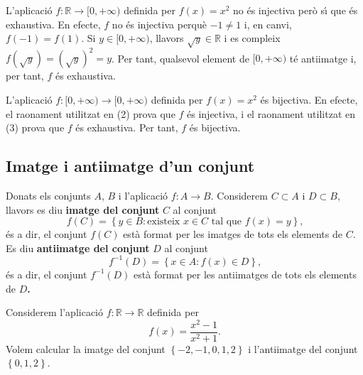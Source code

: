 \begin{exemple}
L'aplicaci\'{o} $f:\mathbb{R}\longrightarrow\lbrack0,+\infty)$ definida per $%
f(x)=x^{2}$ no \'{e}s injectiva per\`{o} s\'{\i} que \'{e}s exhaustiva. En
efecte, $f$ no \'{e}s injectiva perqu\`{e} $-1\neq1$ i, en canvi, $f(-1)=f(1)
$. Si $y\in\lbrack0,+\infty)$, llavors $\sqrt{y}\in\mathbb{R}$ i es compleix
$f\left( \sqrt{y}\right) =\left( \sqrt{y}\right) ^{2}=y$. Per tant,
qualsevol element de $[0,+\infty)$ t\'{e} antiimatge i, per tant, $f$ \'{e}s
exhaustiva.
\end{exemple}

\begin{exemple}
L'aplicaci\'{o} $f:[0,+\infty)\longrightarrow\lbrack0,+\infty)$ definida per
$f(x)=x^{2}$ \'{e}s bijectiva. En efecte, el raonament utilitzat en (2)
prova que $f$ \'{e}s injectiva, i el raonament utilitzat en (3) prova que $f$
\'{e}s exhaustiva. Per tant, $f$ \'{e}s bijectiva.
\end{exemple}

\subsection{Imatge i antiimatge d'un conjunt}

Donats els conjunts $A$, $B$ i l'aplicaci\'{o} $f:A\longrightarrow B$.
Considerem $C\subset A$ i $D\subset B$, llavors es diu \textbf{imatge del
conjunt} $C$ al conjunt%
\begin{equation*}
f(C)=\left\{ y\in B:\text{existeix }x\in C\text{ tal que }f(x)=y\right\}
\text{,}
\end{equation*}
\'{e}s a dir, el conjunt $f(C)$ est\`{a} format per les imatges de tots els
elements de $C$. Es diu \textbf{antiimatge del conjunt} $D$ al conjunt%
\begin{equation*}
f^{-1}(D)=\left\{ x\in A:f(x)\in D\right\} \text{,}
\end{equation*}
\'{e}s a dir, el conjunt $f^{-1}(D)$ est\`{a} format per les antiimatges de
tots els elements de $D$\textbf{. }

\begin{exemple}
Considerem l'aplicaci\'{o} $f:\mathbb{R}\longrightarrow\mathbb{R}$ definida
per%
\begin{equation*}
f(x)=\frac{x^{2}-1}{x^{2}+1}\text{.}
\end{equation*}
Volem calcular la imatge del conjunt $\left\{ -2,-1,0,1,2\right\} $ i
l'antiimatge del conjunt $\left\{ 0,1,2\right\} $.
\end{exemple}

